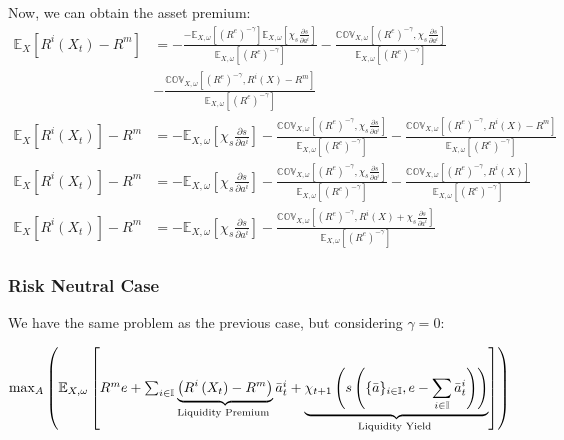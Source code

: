 {\small Now, we can obtain the asset premium:}
\begin{align*}
\mathbb{E}_{X}\left[R^{i}\left(X_{t}\right)-R^{m}\right] & =-\frac{-\mathbb{E}_{X,\omega}\left[\left(R^{e}\right)^{-\gamma}\right]\mathbb{E}_{X,\omega}\left[\chi_{s}\frac{\partial s}{\partial a^{i}}\right]}{\mathbb{E}_{X,\omega}\left[\left(R^{e}\right)^{-\gamma}\right]}-\frac{\mathbb{COV}_{X,\omega}\left[\left(R^{e}\right)^{-\gamma},\chi_{s}\frac{\partial s}{\partial a^{i}}\right]}{\mathbb{E}_{X,\omega}\left[\left(R^{e}\right)^{-\gamma}\right]}\\
 & -\frac{\mathbb{COV}_{X,\omega}\left[\left(R^{e}\right)^{-\gamma},R^{i}\left(X\right)-R^{m}\right]}{\mathbb{E}_{X,\omega}\left[\left(R^{e}\right)^{-\gamma}\right]}\\
\mathbb{E}_{X}\left[R^{i}\left(X_{t}\right)\right]-R^{m} & =-\mathbb{E}_{X,\omega}\left[\chi_{s}\frac{\partial s}{\partial a^{i}}\right]-\frac{\mathbb{COV}_{X,\omega}\left[\left(R^{e}\right)^{-\gamma},\chi_{s}\frac{\partial s}{\partial a^{i}}\right]}{\mathbb{E}_{X,\omega}\left[\left(R^{e}\right)^{-\gamma}\right]}-\frac{\mathbb{COV}_{X,\omega}\left[\left(R^{e}\right)^{-\gamma},R^{i}\left(X\right)-R^{m}\right]}{\mathbb{E}_{X,\omega}\left[\left(R^{e}\right)^{-\gamma}\right]}\\
\mathbb{E}_{X}\left[R^{i}\left(X_{t}\right)\right]-R^{m} & =-\mathbb{E}_{X,\omega}\left[\chi_{s}\frac{\partial s}{\partial a^{i}}\right]-\frac{\mathbb{COV}_{X,\omega}\left[\left(R^{e}\right)^{-\gamma},\chi_{s}\frac{\partial s}{\partial a^{i}}\right]}{\mathbb{E}_{X,\omega}\left[\left(R^{e}\right)^{-\gamma}\right]}-\frac{\mathbb{COV}_{X,\omega}\left[\left(R^{e}\right)^{-\gamma},R^{i}\left(X\right)\right]}{\mathbb{E}_{X,\omega}\left[\left(R^{e}\right)^{-\gamma}\right]}\\
\mathbb{E}_{X}\left[R^{i}\left(X_{t}\right)\right]-R^{m} & =-\mathbb{E}_{X,\omega}\left[\chi_{s}\frac{\partial s}{\partial a^{i}}\right]-\frac{\mathbb{COV}_{X,\omega}\left[\left(R^{e}\right)^{-\gamma},R^{i}\left(X\right)+\chi_{s}\frac{\partial s}{\partial a^{i}}\right]}{\mathbb{E}_{X,\omega}\left[\left(R^{e}\right)^{-\gamma}\right]}
\end{align*}


\subsubsection{Risk Neutral Case}

{\small We have the same problem as the previous case, but considering
$\gamma=0$:}{\small\par}
\begin{center}
{\small$\max_{A}\left(\mathbb{E}_{X,\omega}\left[R^{m}e+\sum_{i\in\mathbb{I}}\underbrace{\left(R^{i}\left(X_{t}\right)-R^{m}\right)}_{\text{Liquidity Premium }}\bar{a}_{t}^{i}+\text{\ensuremath{\underbrace{\chi_{t+1}\left(s\left(\{\bar{a}\}_{i \in\mathbb{I}}, e-\sum_{i \in\mathbb{I}} \bar{a}_{t}^{i}\right)\right)}_{\text{Liquidity Yield }}}}\right]\right)$}{\small\par}
\par\end{center}

